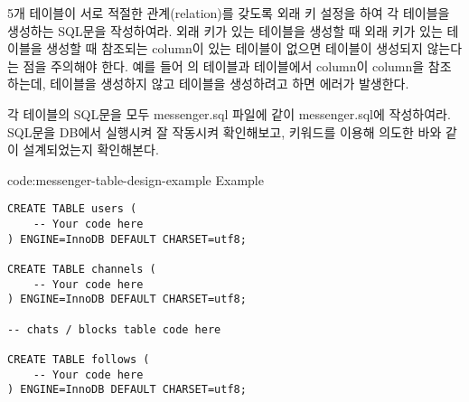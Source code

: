 5개 테이블이 서로 적절한 관계(relation)를 갖도록 외래 키 설정을 하여 각 테이블을 생성하는 SQL문을 작성하여라. 외래 키가 있는 테이블을 생성할 때 외래 키가 있는 테이블을 생성할 때 참조되는 column이 있는 테이블이 없으면 테이블이 생성되지 않는다는 점을 주의해야 한다. 예를 들어 의  테이블과  테이블에서  column이  column을 참조하는데,  테이블을 생성하지 않고  테이블을 생성하려고 하면 에러가 발생한다.

각 테이블의 SQL문을 모두 messenger.sql 파일에 \과 같이 messenger.sql에 작성하여라. SQL문을 DB에서 실행시켜 잘 작동시켜 확인해보고,  키워드를 이용해 의도한 바와 같이 설계되었는지 확인해본다.

\begin{codeenv}{code:messenger-table-design-example}{ Example}\begin{verbatim}
CREATE TABLE users (
    -- Your code here
) ENGINE=InnoDB DEFAULT CHARSET=utf8;

CREATE TABLE channels (
    -- Your code here
) ENGINE=InnoDB DEFAULT CHARSET=utf8;

-- chats / blocks table code here

CREATE TABLE follows (
    -- Your code here
) ENGINE=InnoDB DEFAULT CHARSET=utf8;
\end{verbatim}
\end{codeenv}
